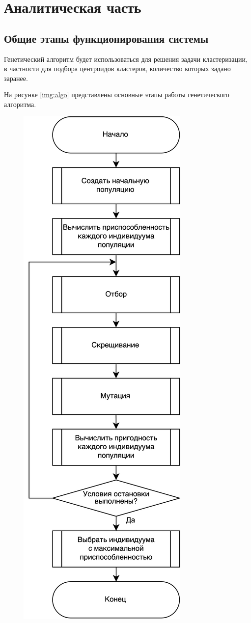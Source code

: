 \chapter{Аналитическая часть}

\section{Общие этапы функционирования системы}

Генетический алгоритм будет использоваться для решения задачи кластеризации, в частности для подбора центроидов кластеров, количество которых задано заранее.

На рисунке \ref{img:algo} представлены основные этапы работы генетического алгоритма.

\begin{figure}
	\begin{center}
		\includegraphics[height=0.95\textheight]{images/algo.png}

\end{center}
\end{figure}
